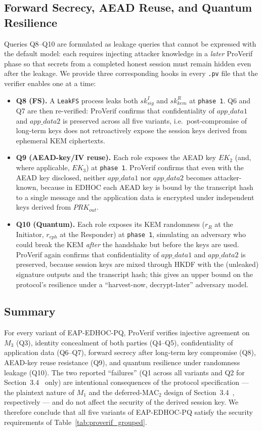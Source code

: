 \documentclass{easychair}
\newcommand{\VarSec}[1]{Section~#1~\cite{pq-edhoc-draft}}
\begin{document}
\subsection{Forward Secrecy, AEAD Reuse, and Quantum Resilience}
Queries Q8--Q10 are formulated as leakage queries that cannot be
expressed with the default model: each requires injecting attacker
knowledge in a \emph{later} ProVerif phase so that secrets from a
completed honest session must remain hidden even after the leakage.
We provide three corresponding hooks in every \texttt{.pv} file that
the verifier enables one at a time:
\begin{itemize}[leftmargin=1.2em,itemsep=2pt,topsep=2pt]
\item \textbf{Q8 (FS).} A \texttt{LeakFS} process leaks both
$\mathit{sk}^I_{\mathit{sig}}$ and $\mathit{sk}^R_{\mathit{kem}}$ at
\texttt{phase 1}. Q6 and Q7 are then re-verified: ProVerif confirms
that confidentiality of $\mathit{app\_data1}$ and $\mathit{app\_data2}$
is preserved across all five variants, i.e.\ post-compromise of
long-term keys does not retroactively expose the session keys derived
from ephemeral KEM ciphertexts.
\item \textbf{Q9 (AEAD-key/IV reuse).} Each role exposes the AEAD key
$EK_2$ (and, where applicable, $EK_3$) at \texttt{phase 1}.
ProVerif confirms that even with the AEAD key disclosed, neither
$\mathit{app\_data1}$ nor $\mathit{app\_data2}$ becomes attacker-known,
because in EDHOC each AEAD key is bound by the transcript hash to a
single message and the application data is encrypted under independent
keys derived from $\mathit{PRK}_{out}$.
\item \textbf{Q10 (Quantum).} Each role exposes its KEM randomness
($r_R$ at the Initiator, $r_{eph}$ at the Responder) at
\texttt{phase 1}, simulating an adversary who could break the KEM
\emph{after} the handshake but before the keys are used. ProVerif
again confirms that confidentiality of $\mathit{app\_data1}$ and
$\mathit{app\_data2}$ is preserved, because session keys are mixed
through HKDF with the (unleaked) signature outputs and the transcript
hash; this gives an upper bound on the protocol's resilience under a
``harvest-now, decrypt-later'' adversary model.
\end{itemize}

\subsection{Summary}
For every variant of EAP-EDHOC-PQ, ProVerif verifies injective
agreement on $M_3$ (Q3), identity concealment of both parties
(Q4--Q5), confidentiality of application data (Q6--Q7), forward
secrecy after long-term key compromise (Q8), AEAD-key reuse resistance
(Q9), and quantum resilience under randomness leakage (Q10). The two
reported ``failures'' (Q1 across all variants and Q2 for \VarSec{3.4}
only) are intentional consequences of the protocol specification ---
the plaintext nature of $M_1$ and the deferred-MAC$_2$ design of
\VarSec{3.4}, respectively --- and do not affect the security of the
derived session key. We therefore conclude that all five variants of
EAP-EDHOC-PQ satisfy the security requirements of
Table~\ref{tab:proverif_grouped}.
\end{document}
